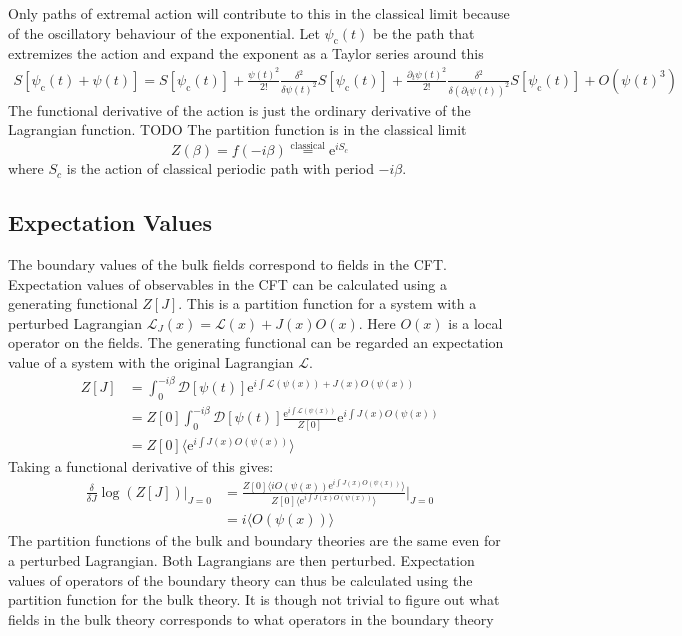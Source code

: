 \documentclass[12pt]{article}
\newcommand{\e}{\ensuremath{\mathrm{e}}}
\renewcommand{\L}{\ensuremath{\mathcal{L}}}
\renewcommand{\i}{\ensuremath{i}}
\begin{document}
Only paths of extremal action will contribute to this in the classical limit because of the oscillatory behaviour of the exponential. Let $\psi_\mathrm{c}(t)$ be the path that extremizes the action and expand the exponent as a Taylor series around this
\begin{equation}
\begin{split}
 S[\psi_\mathrm{c}(t)+\psi(t)]=S[\psi_\mathrm{c}(t)]+\frac{\psi(t)^2}{2!}\frac{\delta^2}{\delta\psi(t)^2} S[\psi_\mathrm{c}(t)]+
\frac{\partial_t\psi(t)^2}{2!}\frac{\delta^2}{\delta(\partial_t\psi(t))^2} S[\psi_\mathrm{c}(t)]+O(\psi(t)^3)
\end{split}
\end{equation}
The functional derivative of the action is just the ordinary derivative of the Lagrangian function. TODO
The partition function is in the classical limit
\begin{equation}
 Z(\beta)=f(-\i\beta)\stackrel{\mathrm{classical}}{=} \e^{i S_c}\label{classical}
\end{equation}
where $S_c$ is the action of classical periodic path with period $-\i\beta$.
\subsection{Expectation Values}
The boundary values of the bulk fields correspond to fields in the CFT. Expectation values of observables in the CFT can be calculated using a generating functional $Z[J]$. This is a partition function for a system with a perturbed Lagrangian $\L_J(x)=\L(x)+J(x)O(x)$. Here $O(x)$ is a local operator on the fields. The generating functional can be regarded an expectation value of a system with the original Lagrangian $\L$.
\begin{equation}
\begin{split}
 Z[J]&=\int_0^{-\i\beta} \mathcal{D}[\psi(t)]\e^{\i \int \L(\psi(x))+J(x)O(\psi(x))}\\
&=Z[0]\int_0^{-\i\beta} \mathcal{D}[\psi(t)]\frac{\e^{\i\int \L(\psi(x))}}{Z[0]}\e^{\i\int J(x)O(\psi(x))}\\
&=Z[0]\langle\e^{\i\int J(x)O(\psi(x))}\rangle
\end{split}
\end{equation}
Taking a functional derivative of this gives:
\begin{equation}
\begin{split}
 \frac{\delta}{\delta J}\log(Z[J])|_{J=0}&=\frac{Z[0]\langle\i O(\psi(x))\e^{\i\int J(x)O(\psi(x))}\rangle}{  Z[0]\langle\e^{\i \int J(x)O(\psi(x))}\rangle }\big |_{J=0}\\
&=\i \langle O(\psi(x))\rangle\label{expectation}
\end{split}
\end{equation}
The partition functions of the bulk and boundary theories are the same even for a perturbed Lagrangian. Both Lagrangians are then perturbed. Expectation values of operators of the boundary theory can thus be calculated using the partition function for the bulk theory. It is though not trivial to figure out what fields in the bulk theory corresponds to what operators in the boundary theory
\end{document}
